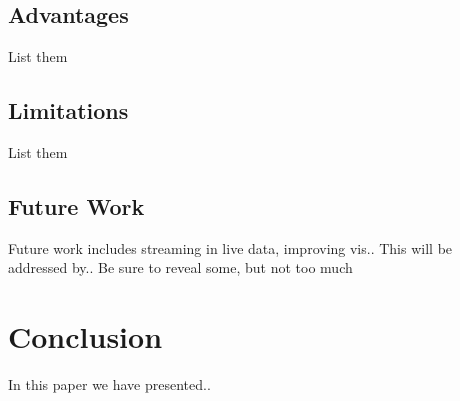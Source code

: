 \subsection{Advantages}
{\color{red}List them}

\subsection{Limitations}
{\color{red}List them}

\subsection{Future Work}
{\color{red}Future work includes streaming in live data, improving vis.. This will be addressed by..}
{\color{red}Be sure to reveal some, but not too much}

\section{Conclusion}
{\color{red}In this paper we have presented..}








